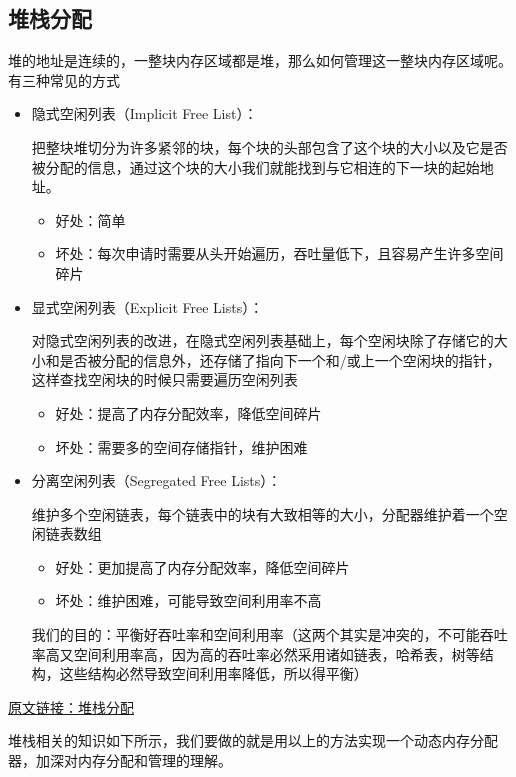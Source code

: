 \subsection{堆栈分配}
堆的地址是连续的，一整块内存区域都是堆，那么如何管理这一整块内存区域呢。有三种常见的方式
\begin{itemize}
\item 隐式空闲列表（Implicit Free List）：

把整块堆切分为许多紧邻的块，每个块的头部包含了这个块的大小以及它是否被分配的信息，通过这个块的大小我们就能找到与它相连的下一块的起始地址。
    \begin{itemize}
        \item 好处：简单
        \item 坏处：每次申请时需要从头开始遍历，吞吐量低下，且容易产生许多空间碎片
    \end{itemize}

\item 显式空闲列表（Explicit Free Lists）：

对隐式空闲列表的改进，在隐式空闲列表基础上，每个空闲块除了存储它的大小和是否被分配的信息外，还存储了指向下一个和/或上一个空闲块的指针，这样查找空闲块的时候只需要遍历空闲列表
    \begin{itemize}
        \item 好处：提高了内存分配效率，降低空间碎片
        \item 坏处：需要多的空间存储指针，维护困难
    \end{itemize}

\item 分离空闲列表（Segregated Free Lists）：

维护多个空闲链表，每个链表中的块有大致相等的大小，分配器维护着一个空闲链表数组
    \begin{itemize}
        \item 好处：更加提高了内存分配效率，降低空间碎片
        \item 坏处：维护困难，可能导致空间利用率不高
    \end{itemize}

我们的目的：平衡好吞吐率和空间利用率（这两个其实是冲突的，不可能吞吐率高又空间利用率高，因为高的吞吐率必然采用诸如链表，哈希表，树等结构，这些结构必然导致空间利用率降低，所以得平衡）
\end{itemize}

\href{https://blog.csdn.net/m0_65591847/article/details/132922447}{原文链接：堆栈分配}

堆栈相关的知识如下所示，我们要做的就是用以上的方法实现一个动态内存分配器，加深对内存分配和管理的理解。

